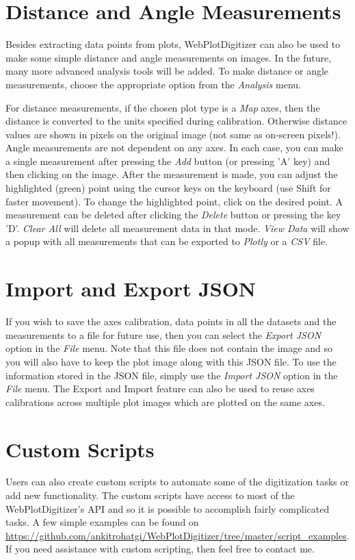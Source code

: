 \documentclass[letterpaper, 11pt]{article}
\begin{document}
\section{Distance and Angle Measurements}
Besides extracting data points from plots, WebPlotDigitizer can also be used to make some simple distance and angle measurements on images. In the future, many more advanced analysis tools will be added. To make distance or angle measurements, choose the appropriate option from the \emph{Analysis} menu.

For distance measurements, if the chosen plot type is a \emph{Map} axes, then the distance is converted to the units specified during calibration. Otherwise distance values are shown in pixels on the original image (not same as on-screen pixels!). Angle measurements are not dependent on any axes. In each case, you can make a single measurement after pressing the \emph{Add} button (or pressing 'A' key) and then clicking on the image. After the measurement is made, you can adjust the highlighted (green) point using the cursor keys on the keyboard (use Shift for faster movement). To change the highlighted point, click on the desired point. A measurement can be deleted after clicking the \emph{Delete} button or pressing the key 'D'. \emph{Clear All} will delete all measurement data in that mode. \emph{View Data} will show a popup with all measurements that can be exported to \emph{Plotly} or a \emph{CSV} file.

\section{Import and Export JSON}
\label{sec:jsonImportExport}
If you wish to save the axes calibration, data points in all the datasets and the measurements to a file for future use, then you can select the \emph{Export JSON} option in the \emph{File} menu. Note that this file does not contain the image and so you will also have to keep the plot image along with this JSON file. To use the information stored in the JSON file, simply use the \emph{Import JSON} option in the \emph{File} menu. The Export and Import feature can also be used to reuse axes calibrations across multiple plot images which are plotted on the same axes.

\section{Custom Scripts}
Users can also create custom scripts to automate some of the digitization tasks or add new functionality. The custom scripts have access to most of the WebPlotDigitizer's API and so it is possible to accomplish fairly complicated tasks. A few simple examples can be found on \url{https://github.com/ankitrohatgi/WebPlotDigitizer/tree/master/script_examples}. If you need assistance with custom scripting, then feel free to contact me.
\end{document}
